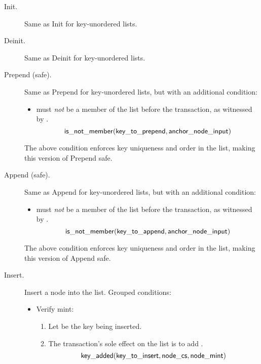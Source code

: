 \documentclass[../midgard.tex]{subfiles}
\begin{document}
\begin{description}
    \item[Init.] Same as Init for key-unordered lists.
        \initSpendingValidatorWarning
    \item[Deinit.] Same as Deinit for key-unordered lists.
    \item[Prepend (safe).] Same as Prepend for key-unordered lists, but with an additional condition:
        \begin{itemize}
            \item {} must \emph{not} be a member of the list before the transaction, as witnessed by .
                \begin{equation*}
                    \mathsf{is\_not\_member} (\mathsf{key\_to\_prepend}, \mathsf{anchor\_node\_input})
                \end{equation*}
        \end{itemize}

    The above condition enforces key uniqueness and order in the list, making this version of Prepend safe.
    
    \item[Append (safe).] Same as Append for key-unordered lists, but with an additional condition:
        \begin{itemize}
            \item {} must \emph{not} be a member of the list before the transaction, as witnessed by .
                \begin{equation*}
                    \mathsf{is\_not\_member} (\mathsf{key\_to\_append}, \mathsf{anchor\_node\_input})
                \end{equation*}
        \end{itemize}

    The above condition enforces key uniqueness and order in the list, making this version of Append safe.
    
    \item[Insert.] Insert a node into the list.
      Grouped conditions:
        \begin{itemize}
            \item Verify mint:
            \begin{enumerate}
                \item Let  be the key being inserted.
                \item The transaction's sole effect on the list is to add .
                    \begin{equation*}
                        \mathsf{key\_added}(\mathsf{key\_to\_insert}, \mathsf{node\_cs}, \mathsf{node\_mint})
                    \end{equation*}
            \end{enumerate}
            

\end{itemize}
\end{description}
\end{document}
